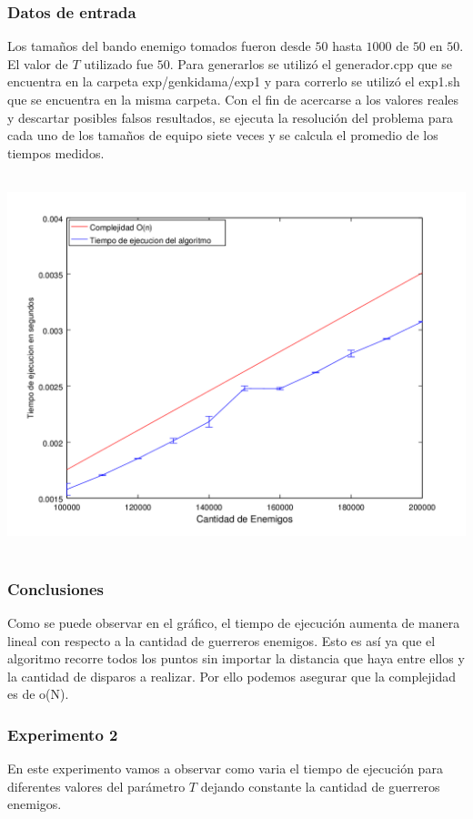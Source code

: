 		\subsubsection*{Datos de entrada}\;
			Los tamaños del bando enemigo tomados fueron  desde $50$ hasta $1000$ de $50$ en $50$. \;
			El valor de $T$ utilizado fue $50$.\;
			Para generarlos se utilizó el generador.cpp que se encuentra en la carpeta exp/genkidama/exp1 y para correrlo se utilizó el exp1.sh que se encuentra en la misma carpeta. \;
			Con el fin de acercarse a los valores reales y descartar posibles falsos resultados, se ejecuta la resolución del problema para cada uno de los tamaños de equipo siete veces y se calcula el promedio de los tiempos medidos.\;

      	\includegraphics[height=11cm]{graficos/genkidama-exp1.png}


    	\subsubsection*{Conclusiones}
			Como se puede observar en el gráfico, el tiempo de ejecución aumenta de manera lineal con respecto a la cantidad de guerreros enemigos. Esto es así ya que el algoritmo recorre todos los puntos sin importar la distancia que haya entre ellos y la cantidad de disparos a realizar. Por ello podemos asegurar que la complejidad es de o(N).
			\\



		\subsubsection*{Experimento 2}\;
			En este experimento vamos a observar como varia el tiempo de ejecución para diferentes valores del parámetro $T$ dejando constante la cantidad de guerreros enemigos.\;


